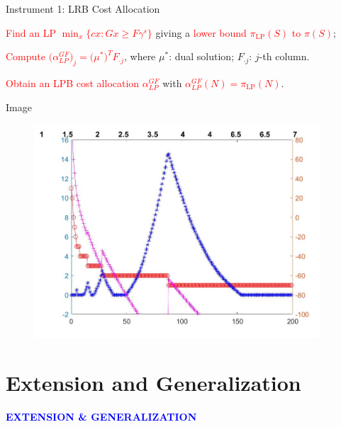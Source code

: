 \documentclass[14pt]{beamer}
\begin{document}
\begin{frame}{Instrument 1: LRB Cost Allocation}
\begin{description}
\justifying
\footnotesize
	\item[Step 1.] \textcolor{red}{Find an LP $\min_x \big\{cx:Gx \geq F\gamma^s\big\}$} giving a \textcolor{red}{lower bound $\pi_{\mathrm{LP}}(S)$ to $\pi(S)$};
	\item[Step 2.] \textcolor{red}{Compute $\big(\alpha^{GF}_{LP}\big)_j = \big(\mu^*\big)^T F_{\cdot j}$}, where $\mu^*$: dual solution; $F_{\cdot j}$: $j$-th column.
	\item[Step 3.] \textcolor{red}{Obtain an LPB cost allocation $\alpha^{GF}_{LP}$} with \textcolor{red}{$\alpha^{GF}_{LP}(N) = \pi_{\mathrm{LP}}(N)$}.
\end{description}
\end{frame}

\begin{frame}{Image}
	\vspace{-3mm}
	\begin{figure}[H]
	\centering
	\includegraphics[width=0.95\textwidth]{Figures/Image30}
	\end{figure}
	\centering
\end{frame}

\section{Extension and Generalization}
\begin{frame}
\centering
\large
\textcolor{blue}{\bf {\huge E}XTENSION \&  {\huge G}ENERALIZATION}
\end{frame}
\end{document}
